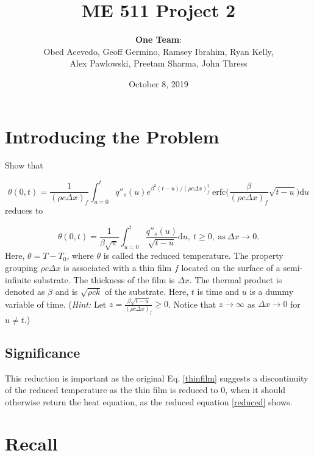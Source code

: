 \documentclass{article}
\title{\textbf{ME 511 Project 2}}
\author{\textbf{One Team}: \\ Obed Acevedo, Geoff Germino, Ramsey Ibrahim, Ryan Kelly, \\ Alex Pawlowski, Preetam Sharma, John Thress}
\date{October 8, 2019}
\begin{document}
\maketitle

\section{Introducing the Problem}


Show that

\begin{equation}
  \theta(0,t) = \frac{1}{(\rho c \Delta x)_f}\int_{u=0}^t q''_s(u)e^{\beta^2(t-u)/(\rho c \Delta x)^{2}_f} \ \text{erfc}\bigg(\frac{\beta}{(\rho c \Delta x)_f} \sqrt{t-u}\bigg)\text{d}u
    \label{thinfilm}
\end{equation}
reduces to

\begin{equation}
    \theta(0,t) = \frac{1}{\beta\sqrt{\pi}}\int_{u=0}^t\frac{q''_s(u)}{\sqrt{t-u}}\text{d}u, \   t\geq 0, \   \text{as} \   \Delta x \xrightarrow{}0.
    \label{reduced}
\end{equation}
\newline 
Here, $\theta=T-T_0$, where $\theta$ is called the reduced temperature. The property grouping $\rho c \Delta x$ is associated with a thin film $f$ located on the surface of a semi-infinite substrate. The thickness of the film is $\Delta x$. The thermal product is denoted as $\beta$ and is $\sqrt{\rho c k}$ of the substrate. Here, $t$ is time and $u$ is a dummy variable of time.
\newline
\newline
\noindent(\emph{Hint:} Let $ z=\frac{\beta\sqrt{t-u}}{(\rho c \Delta x)_f} \geq 0 $.                                    Notice that $z\rightarrow\infty$  as $ \Delta x\rightarrow 0 $ for $ u \ne t$.)

\subsection*{Significance}
This reduction is important as the original Eq. \eqref{thinfilm} suggests a discontinuity of the reduced temperature as the thin film is reduced to 0, when it should otherwise return the heat equation, as the reduced equation \eqref{reduced} shows.

\section{Recall}
\end{document}

